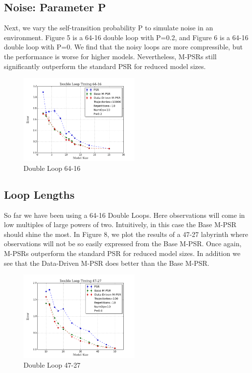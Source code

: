 \subsection{Noise: Parameter P}

Next, we vary the self-transition probability P to simulate noise in an environment. Figure 5 is a 64-16 double loop with P=0.2, and Figure 6 is a 64-16 double loop with P=0. We find that the noisy loops are more compressible, but the performance is worse for higher models. Nevertheless, M-PSRs still significantly outperform the standard PSR for reduced model sizes.

\begin{figure}[ht!]
\centering
\includegraphics[width=60mm]{uCOREPICS/DL/NoiseInfo.png}
\caption{Double Loop 64-16\label{overflow}}
\end{figure}

\subsection{Loop Lengths}

So far we have been using a 64-16 Double Loops. Here observations will come in low multiples of large powers of two. Intuitively, in this case the Base M-PSR should shine the most. In Figure 8, we plot the results of a 47-27 labyrinth where observations will not be so easily expressed from the Base M-PSR. Once again, M-PSRs outperform the standard PSR for reduced model sizes. In addition we see that the Data-Driven M-PSR does better than the Base M-PSR.

\begin{figure}[ht!]
\centering
\includegraphics[width=60mm]{uCOREPICS/DL/47-27-10000.png}
\caption{Double Loop 47-27\label{overflow}}
\end{figure}


